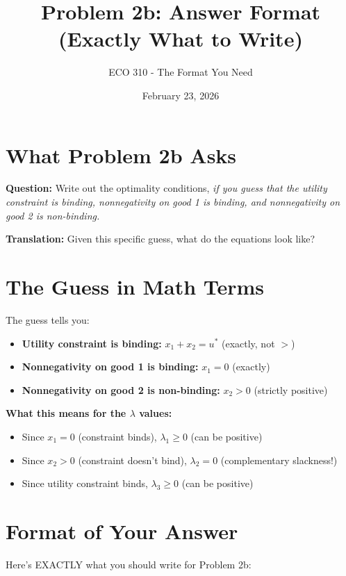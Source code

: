 \documentclass[11pt]{article}
\title{Problem 2b: Answer Format \\ (Exactly What to Write)}
\author{ECO 310 - The Format You Need}
\date{February 23, 2026}
\begin{document}
\maketitle

\section{What Problem 2b Asks}

\textbf{Question:} Write out the optimality conditions, \textit{if you guess that the utility constraint is binding, nonnegativity on good 1 is binding, and nonnegativity on good 2 is non-binding.}

\textbf{Translation:} Given this specific guess, what do the equations look like?

\section{The Guess in Math Terms}

The guess tells you:
\begin{itemize}
\item \textbf{Utility constraint is binding:} $x_1 + x_2 = u^*$ (exactly, not $>$)
\item \textbf{Nonnegativity on good 1 is binding:} $x_1 = 0$ (exactly)
\item \textbf{Nonnegativity on good 2 is non-binding:} $x_2 > 0$ (strictly positive)
\end{itemize}

\textbf{What this means for the $\lambda$ values:}
\begin{itemize}
\item Since $x_1 = 0$ (constraint binds), $\lambda_1 \geq 0$ (can be positive)
\item Since $x_2 > 0$ (constraint doesn't bind), $\lambda_2 = 0$ (complementary slackness!)
\item Since utility constraint binds, $\lambda_3 \geq 0$ (can be positive)
\end{itemize}

\section{Format of Your Answer}

Here's EXACTLY what you should write for Problem 2b:
\end{document}
